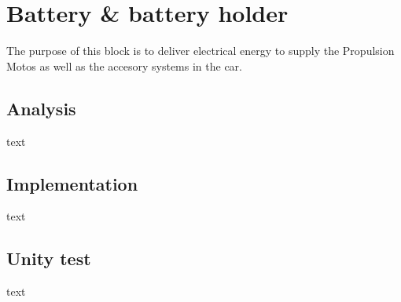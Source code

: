 \section{Battery \& battery holder}
The purpose of this block is to deliver electrical energy to supply the  Propulsion Motos as well as the accesory systems in the car.

\subsection{Analysis}
text

\subsection{Implementation}
text

\subsection{Unity test}
text